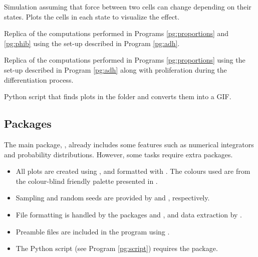\begin{program}[\code{4.09}]\label{pg:adh}
    Simulation assuming that force between two cells can change depending on their states. Plots the cells in each state to visualize the effect.
\end{program}

\begin{program}[\code{4.10}]\label{pg:adh-avgs}
    Replica of the computations performed in Programs \ref{pg:proportions} and \ref{pg:phib} using the set-up described in Program \ref{pg:adh}.
\end{program}

\begin{program}[\code{4.11}]\label{pg:adh-growing}
    Replica of the computations performed in Programs \ref{pg:proportions} using the set-up described in Program \ref{pg:adh} along with proliferation during the differentiation process.
\end{program}

\begin{program}\label{pg:script}
    Python script that finds plots in the folder and converts them into a GIF.
\end{program}


\subsection{Packages}

The main package, , already includes some features such as numerical integrators and probability distributions. However, some tasks require extra packages.
\begin{itemize}
    \item All plots are created using  \parencite{Makie_2021}, and formatted with . The colours used are from the colour-blind friendly palette presented in \cite{Wong_2011}.
    \item Sampling and random seeds are provided by  and , respectively.
    \item File formatting is handled by the packages  and , and data extraction by .
    \item Preamble files are included in the program using .
    \item The Python script (see Program \ref{pg:script}) requires the  package.
\end{itemize}


